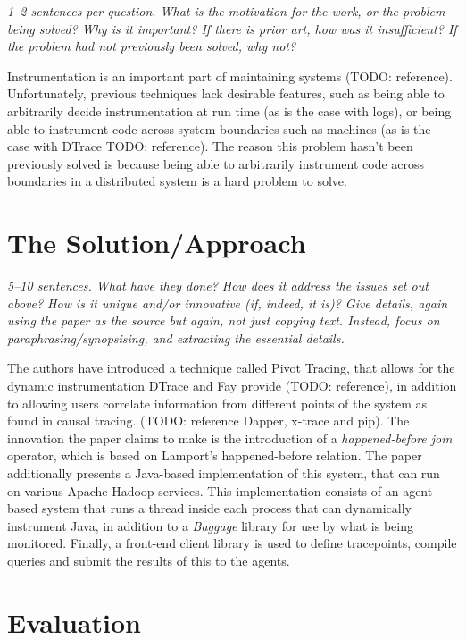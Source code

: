 \documentclass[11pt]{article}
\begin{document}
\textsl{1--2 sentences per question. What is the motivation for the work, or
the problem being solved? Why is it important? If there is prior art, how was
it insufficient? If the problem had not previously been solved, why not?}

Instrumentation is an important part of maintaining systems (TODO: reference).
Unfortunately, previous techniques lack desirable features, such as being able
to arbitrarily decide instrumentation at run time (as is the case with logs),
or being able to instrument code across system boundaries such as machines (as
is the case with DTrace TODO: reference). The reason this problem hasn't been
previously solved is because being able to arbitrarily instrument code across
boundaries in a distributed system is a hard problem to solve.


\section*{The Solution/Approach}

\textsl{5--10 sentences. What have they done? How does it address the issues
set out above? How is it unique and/or innovative (if, indeed, it is)? Give
details, again using the paper as the source but again, not just copying text.
Instead, focus on paraphrasing/synopsising, and extracting the essential
details.}

The authors have introduced a technique called Pivot Tracing, that allows for
the dynamic instrumentation DTrace and Fay provide (TODO: reference), in
addition to allowing users correlate information from different points of the
system as found in causal tracing. (TODO: reference Dapper, x-trace and pip).
The innovation the paper claims to make is the introduction of a
\textit{happened-before join} operator, which is based on Lamport's
happened-before relation. The paper additionally presents a Java-based
implementation of this system, that can run on various Apache Hadoop
\cite{Hadoop} services. This implementation consists of an agent-based system
that runs a thread inside each process that can dynamically instrument Java, in
addition to a \textit{Baggage} library for use by what is being monitored.
Finally, a front-end client library is used to define tracepoints, compile
queries and submit the results of this to the agents.


\section*{Evaluation}
\end{document}
